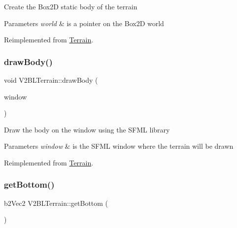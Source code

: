 Create the Box2D static body of the terrain 
\begin{DoxyParams}{Parameters}
{\em world} & is a pointer on the Box2D world \\
\hline
\end{DoxyParams}


Reimplemented from \mbox{\hyperlink{class_terrain_a97e007277f8abb9dde20ef2b49c38a3a}{Terrain}}.

\mbox{\label{class_v2_b_l_terrain_aea63be5e3b6d05da4c3b5ce954429a4b}} 
\subsubsection{\texorpdfstring{draw\+Body()}{drawBody()}}
{\footnotesize\ttfamily void V2\+B\+L\+Terrain\+::draw\+Body (\begin{DoxyParamCaption}\item[{sf\+::\+Render\+Window \&}]{window }\end{DoxyParamCaption})\hspace{0.3cm}{\ttfamily [virtual]}}

Draw the body on the window using the S\+F\+ML library 
\begin{DoxyParams}{Parameters}
{\em window} & is the S\+F\+ML window where the terrain will be drawn \\
\hline
\end{DoxyParams}


Reimplemented from \mbox{\hyperlink{class_terrain_ae60571b91c1979fa94bdfc5002da6ac7}{Terrain}}.

\mbox{\label{class_v2_b_l_terrain_a0534b144e38d8ffea797c3713b3d5380}} 
\subsubsection{\texorpdfstring{get\+Bottom()}{getBottom()}}
{\footnotesize\ttfamily b2\+Vec2 V2\+B\+L\+Terrain\+::get\+Bottom (\begin{DoxyParamCaption}{ }\end{DoxyParamCaption})\hspace{0.3cm}{\ttfamily [virtual]}}


